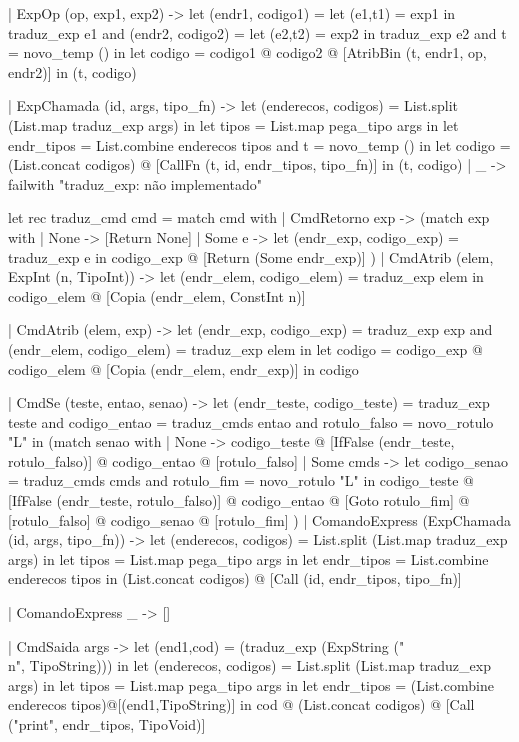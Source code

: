 \documentclass[12pt,a4paper,twoside]{article}
\begin{document}
\begin{terminal}
  | ExpOp (op, exp1, exp2) ->
    let (endr1, codigo1) = let (e1,t1) = exp1 in traduz_exp e1
    and (endr2, codigo2) = let (e2,t2) = exp2 in traduz_exp e2
    and t = novo_temp () in
    let codigo = codigo1 @ codigo2 @ [AtribBin (t, endr1, op, endr2)] in
    (t, codigo)    

  | ExpChamada (id, args, tipo_fn) ->
      let (enderecos, codigos) = List.split (List.map traduz_exp args) in
      let tipos = List.map pega_tipo args in
      let endr_tipos = List.combine enderecos tipos  
      and t = novo_temp () in 
      let codigo = (List.concat codigos) @
                   [CallFn (t, id, endr_tipos, tipo_fn)]
      in
        (t, codigo)
  | _ -> failwith "traduz_exp: não implementado"


let rec traduz_cmd cmd =
  match cmd with
  | CmdRetorno exp ->
    (match exp with
     | None -> [Return None]
     | Some e ->
       let (endr_exp, codigo_exp) = traduz_exp e in
       codigo_exp @ [Return (Some endr_exp)]
    )
  | CmdAtrib (elem, ExpInt (n, TipoInt)) ->
    let (endr_elem, codigo_elem) = traduz_exp elem 
    in codigo_elem @ [Copia (endr_elem, ConstInt n)]

  | CmdAtrib (elem, exp) ->
    let (endr_exp, codigo_exp) = traduz_exp exp 
    and (endr_elem, codigo_elem) = traduz_exp elem in
    let codigo = codigo_exp @ codigo_elem @ [Copia (endr_elem, endr_exp)] 
    in codigo

  | CmdSe (teste, entao, senao) ->
    let (endr_teste, codigo_teste) = traduz_exp teste 
    and codigo_entao = traduz_cmds entao 
    and rotulo_falso = novo_rotulo "L" in
    (match senao with
        | None -> codigo_teste @ 
                  [IfFalse (endr_teste, rotulo_falso)] @
                  codigo_entao @ 
                  [rotulo_falso]
        | Some cmds -> 
          let codigo_senao = traduz_cmds cmds 
          and rotulo_fim = novo_rotulo "L" in
              codigo_teste @ 
              [IfFalse (endr_teste, rotulo_falso)] @
              codigo_entao @ 
              [Goto rotulo_fim] @
              [rotulo_falso] @ codigo_senao @
              [rotulo_fim]
    )
  | ComandoExpress (ExpChamada (id, args, tipo_fn)) -> 
      let (enderecos, codigos) = List.split (List.map traduz_exp args) in
      let tipos = List.map pega_tipo args in
      let endr_tipos = List.combine enderecos tipos in
      (List.concat codigos) @
      [Call (id, endr_tipos, tipo_fn)]

  | ComandoExpress _ -> []

  | CmdSaida args -> 
      let (end1,cod) = (traduz_exp (ExpString ("\\n", TipoString))) in 
      let (enderecos, codigos) = List.split (List.map traduz_exp args) in
      let tipos = List.map pega_tipo args in
      let endr_tipos = (List.combine enderecos tipos)@[(end1,TipoString)] in
      cod @
      (List.concat codigos) @
      [Call ("print", endr_tipos, TipoVoid)]


\end{terminal}
\end{document}
